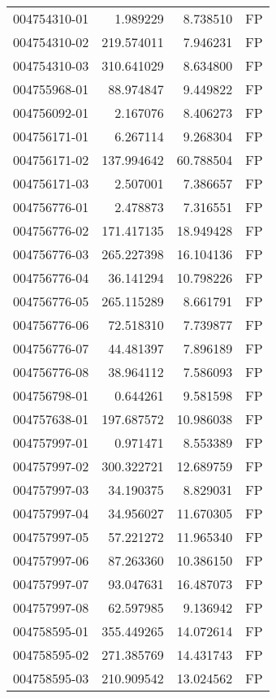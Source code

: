\begin{tabular}{lrrl}
004754310-01 &    1.989229 &     8.738510 &   FP \\
004754310-02 &  219.574011 &     7.946231 &   FP \\
004754310-03 &  310.641029 &     8.634800 &   FP \\
004755968-01 &   88.974847 &     9.449822 &   FP \\
004756092-01 &    2.167076 &     8.406273 &   FP \\
004756171-01 &    6.267114 &     9.268304 &   FP \\
004756171-02 &  137.994642 &    60.788504 &   FP \\
004756171-03 &    2.507001 &     7.386657 &   FP \\
004756776-01 &    2.478873 &     7.316551 &   FP \\
004756776-02 &  171.417135 &    18.949428 &   FP \\
004756776-03 &  265.227398 &    16.104136 &   FP \\
004756776-04 &   36.141294 &    10.798226 &   FP \\
004756776-05 &  265.115289 &     8.661791 &   FP \\
004756776-06 &   72.518310 &     7.739877 &   FP \\
004756776-07 &   44.481397 &     7.896189 &   FP \\
004756776-08 &   38.964112 &     7.586093 &   FP \\
004756798-01 &    0.644261 &     9.581598 &   FP \\
004757638-01 &  197.687572 &    10.986038 &   FP \\
004757997-01 &    0.971471 &     8.553389 &   FP \\
004757997-02 &  300.322721 &    12.689759 &   FP \\
004757997-03 &   34.190375 &     8.829031 &   FP \\
004757997-04 &   34.956027 &    11.670305 &   FP \\
004757997-05 &   57.221272 &    11.965340 &   FP \\
004757997-06 &   87.263360 &    10.386150 &   FP \\
004757997-07 &   93.047631 &    16.487073 &   FP \\
004757997-08 &   62.597985 &     9.136942 &   FP \\
004758595-01 &  355.449265 &    14.072614 &   FP \\
004758595-02 &  271.385769 &    14.431743 &   FP \\
004758595-03 &  210.909542 &    13.024562 &   FP \\

\end{tabular}
